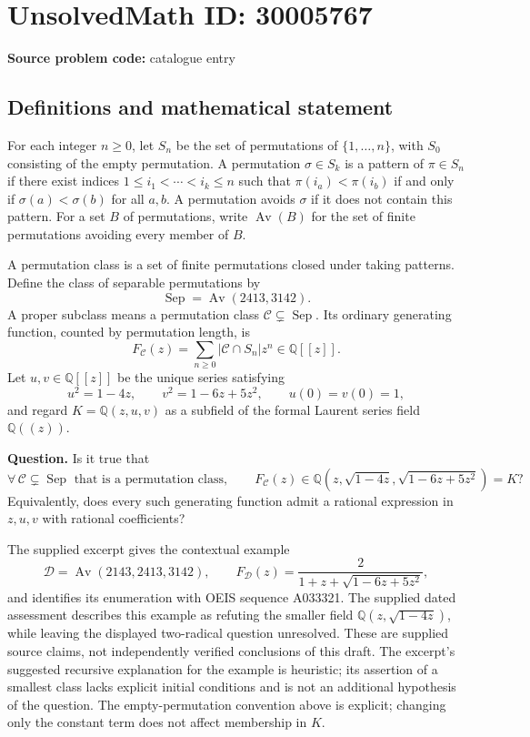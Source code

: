 \documentclass[11pt]{article}
\newcommand{\Q}{\mathbb{Q}}
\begin{document}
\section*{UnsolvedMath ID: 30005767}
\textbf{Source problem code:} catalogue entry
\subsection{Definitions and mathematical statement}
For each integer \(n\geq 0\), let \(S_n\) be the set of permutations of \(\{1,\ldots,n\}\), with \(S_0\) consisting of the empty permutation. A permutation \(\sigma\in S_k\) is a pattern of \(\pi\in S_n\) if there exist indices \(1\leq i_1<\cdots<i_k\leq n\) such that \(\pi(i_a)<\pi(i_b)\) if and only if \(\sigma(a)<\sigma(b)\) for all \(a,b\). A permutation avoids \(\sigma\) if it does not contain this pattern. For a set \(B\) of permutations, write \(\operatorname{Av}(B)\) for the set of finite permutations avoiding every member of \(B\).

A permutation class is a set of finite permutations closed under taking patterns. Define the class of separable permutations by
\[
\operatorname{Sep}=\operatorname{Av}(2413,3142).
\]
A proper subclass means a permutation class \(\mathcal C\subsetneq\operatorname{Sep}\). Its ordinary generating function, counted by permutation length, is
\[
F_{\mathcal C}(z)=\sum_{n\geq0}|\mathcal C\cap S_n|z^n\in\Q[[z]].
\]
Let \(u,v\in\Q[[z]]\) be the unique series satisfying
\[
u^2=1-4z,\qquad v^2=1-6z+5z^2,\qquad u(0)=v(0)=1,
\]
and regard \(K=\Q(z,u,v)\) as a subfield of the formal Laurent series field \(\Q((z))\).

\textbf{Question.} Is it true that
\[
\forall\,\mathcal C\subsetneq\operatorname{Sep}\text{ that is a permutation class},\qquad
F_{\mathcal C}(z)\in\Q\!\left(z,\sqrt{1-4z},\sqrt{1-6z+5z^2}\right)=K?
\]
Equivalently, does every such generating function admit a rational expression in \(z,u,v\) with rational coefficients?

The supplied excerpt gives the contextual example
\[
\mathcal D=\operatorname{Av}(2143,2413,3142),\qquad
F_{\mathcal D}(z)=\frac{2}{1+z+\sqrt{1-6z+5z^2}},
\]
and identifies its enumeration with OEIS sequence A033321. The supplied dated assessment describes this example as refuting the smaller field \(\Q(z,\sqrt{1-4z})\), while leaving the displayed two-radical question unresolved. These are supplied source claims, not independently verified conclusions of this draft. The excerpt's suggested recursive explanation for the example is heuristic; its assertion of a smallest class lacks explicit initial conditions and is not an additional hypothesis of the question. The empty-permutation convention above is explicit; changing only the constant term does not affect membership in \(K\).
\end{document}
